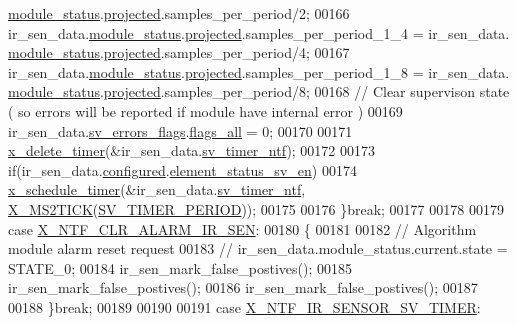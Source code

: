 \begin{DoxyCode}
      \hyperlink{a00023_a5a53c391562b059eb744ac679f3765ca}{module\_status}.\hyperlink{a00017_a6b2516d74583418cec324c50041421c9}{projected}.samples\_per\_period/2;
00166            ir\_sen\_data.\hyperlink{a00023_a5a53c391562b059eb744ac679f3765ca}{module\_status}.\hyperlink{a00017_a6b2516d74583418cec324c50041421c9}{projected}.samples\_per\_period\_1\_4  = ir\_sen\_data.
      \hyperlink{a00023_a5a53c391562b059eb744ac679f3765ca}{module\_status}.\hyperlink{a00017_a6b2516d74583418cec324c50041421c9}{projected}.samples\_per\_period/4;
00167            ir\_sen\_data.\hyperlink{a00023_a5a53c391562b059eb744ac679f3765ca}{module\_status}.\hyperlink{a00017_a6b2516d74583418cec324c50041421c9}{projected}.samples\_per\_period\_1\_8  = ir\_sen\_data.
      \hyperlink{a00023_a5a53c391562b059eb744ac679f3765ca}{module\_status}.\hyperlink{a00017_a6b2516d74583418cec324c50041421c9}{projected}.samples\_per\_period/8;
00168             \textcolor{comment}{// Clear supervison state ( so errors will be reported if module have internal error )}
00169           ir\_sen\_data.\hyperlink{a00023_aaeec6b0609dba31393f337abf1cce3d3}{sv\_errors\_flags}.\hyperlink{a00022_a1caa87b00c878186140c3bac9c8acf3b}{flags\_all} = 0;
00170 
00171           \hyperlink{a00036_ab69e9af4cfa717e870d587906283635c}{x\_delete\_timer}(&ir\_sen\_data.\hyperlink{a00023_ada91b200053f2d93e3639dc4ee3415b4}{sv\_timer\_ntf});
00172 
00173           \textcolor{keywordflow}{if}(ir\_sen\_data.\hyperlink{a00023_a94b2d1f6ea4ab334c74d24984dd27843}{configured}.\hyperlink{a00021_afeb3f74725269028a60926f98890c22b}{element\_status\_sv\_en})
00174           \hyperlink{a00036_a9e3befaa21e83f196f74201deed85346}{x\_schedule\_timer}(&ir\_sen\_data.\hyperlink{a00023_ada91b200053f2d93e3639dc4ee3415b4}{sv\_timer\_ntf},
      \hyperlink{a00036_a1732cd929c486b3a225824bb2b3dba36}{X\_MS2TICK}(\hyperlink{a00023_a8a535456285f4602701c814d7b69cc68}{SV\_TIMER\_PERIOD}));
00175 
00176         \}\textcolor{keywordflow}{break};
00177 
00178 
00179          \textcolor{keywordflow}{case} \hyperlink{a00021_a55be0f14bd98010fdd4ff546f8cffefd}{X\_NTF\_CLR\_ALARM\_IR\_SEN}:
00180         \{
00181 
00182            \textcolor{comment}{// Algorithm module alarm reset request}
00183             \textcolor{comment}{// ir\_sen\_data.module\_status.current.state = STATE\_0;}
00184              ir\_sen\_mark\_false\_postives();
00185              ir\_sen\_mark\_false\_postives();
00186              ir\_sen\_mark\_false\_postives();
00187 
00188         \}\textcolor{keywordflow}{break};
00189 
00190 
00191         \textcolor{keywordflow}{case} \hyperlink{a00023_a3b0f15b601361fafa871c5e49df7842d}{X\_NTF\_IR\_SENSOR\_SV\_TIMER}:

\end{DoxyCode}
